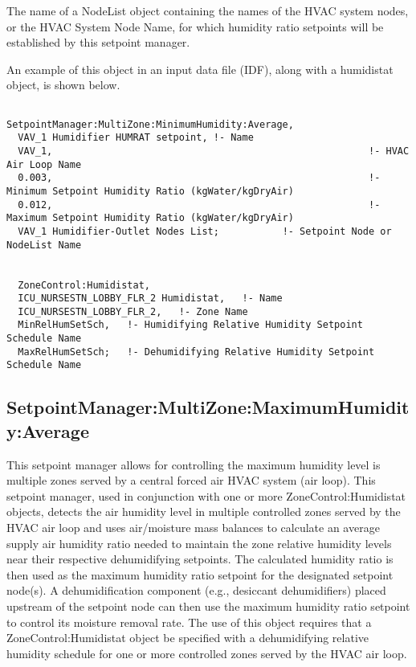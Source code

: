 The name of a NodeList object containing the names of the HVAC system nodes, or the HVAC System Node Name, for which humidity ratio setpoints will be established by this setpoint manager.

An example of this object in an input data file (IDF), along with a humidistat object, is shown below.

\begin{lstlisting}

SetpointManager:MultiZone:MinimumHumidity:Average,
  VAV_1 Humidifier HUMRAT setpoint, !- Name
  VAV_1,                                                       !- HVAC Air Loop Name
  0.003,                                                       !- Minimum Setpoint Humidity Ratio (kgWater/kgDryAir)
  0.012,                                                       !- Maximum Setpoint Humidity Ratio (kgWater/kgDryAir)
  VAV_1 Humidifier-Outlet Nodes List;           !- Setpoint Node or NodeList Name


  ZoneControl:Humidistat,
  ICU_NURSESTN_LOBBY_FLR_2 Humidistat,   !- Name
  ICU_NURSESTN_LOBBY_FLR_2,   !- Zone Name
  MinRelHumSetSch,   !- Humidifying Relative Humidity Setpoint Schedule Name
  MaxRelHumSetSch;   !- Dehumidifying Relative Humidity Setpoint Schedule Name
\end{lstlisting}

\subsection{SetpointManager:MultiZone:MaximumHumidity:Average}\label{setpointmanagermultizonemaximumhumidityaverage}

This setpoint manager allows for controlling the maximum humidity level is multiple zones served by a central forced air HVAC system (air loop). This setpoint manager, used in conjunction with one or more ZoneControl:Humidistat objects, detects the air humidity level in multiple controlled zones served by the HVAC air loop and uses air/moisture mass balances to calculate an average supply air humidity ratio needed to maintain the zone relative humidity levels near their respective dehumidifying setpoints. The calculated humidity ratio is then used as the maximum humidity ratio setpoint for the designated setpoint node(s). A dehumidification component (e.g., desiccant dehumidifiers) placed upstream of the setpoint node can then use the maximum humidity ratio setpoint to control its moisture removal rate. The use of this object requires that a ZoneControl:Humidistat object be specified with a dehumidifying relative humidity schedule for one or more controlled zones served by the HVAC air loop.

